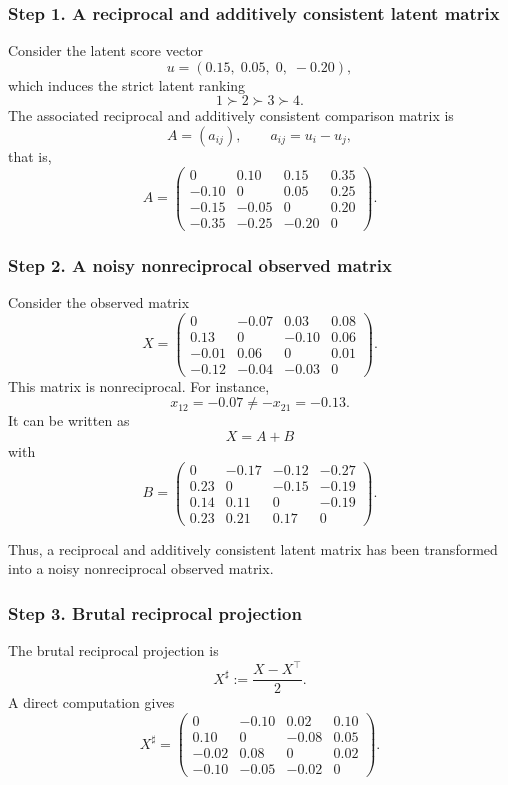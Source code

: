 \documentclass[11pt]{amsart}
\theoremstyle{definition}
\theoremstyle{plain}
\numberwithin{equation}{section}
\begin{document}
\subsubsection*{Step 1. A reciprocal and additively consistent latent matrix}

Consider the latent score vector
\[
u=(0.15,\;0.05,\;0,\;-0.20),
\]
which induces the strict latent ranking
\[
1\succ 2\succ 3\succ 4.
\]
The associated reciprocal and additively consistent comparison matrix is
\[
A=(a_{ij}),\qquad a_{ij}=u_i-u_j,
\]
that is,
\[
A=
\begin{pmatrix}
0 & 0.10 & 0.15 & 0.35\\
-0.10 & 0 & 0.05 & 0.25\\
-0.15 & -0.05 & 0 & 0.20\\
-0.35 & -0.25 & -0.20 & 0
\end{pmatrix}.
\]

\subsubsection*{Step 2. A noisy nonreciprocal observed matrix}

Consider the observed matrix
\[
X=
\begin{pmatrix}
0 & -0.07 & 0.03 & 0.08\\
0.13 & 0 & -0.10 & 0.06\\
-0.01 & 0.06 & 0 & 0.01\\
-0.12 & -0.04 & -0.03 & 0
\end{pmatrix}.
\]
This matrix is nonreciprocal. For instance,
\[
x_{12}=-0.07\neq -x_{21}=-0.13.
\]
It can be written as
\[
X=A+B
\]
with
\[
B=
\begin{pmatrix}
0 & -0.17 & -0.12 & -0.27\\
0.23 & 0 & -0.15 & -0.19\\
0.14 & 0.11 & 0 & -0.19\\
0.23 & 0.21 & 0.17 & 0
\end{pmatrix}.
\]

Thus, a reciprocal and additively consistent latent matrix has been transformed into a noisy nonreciprocal observed matrix.

\subsubsection*{Step 3. Brutal reciprocal projection}

The brutal reciprocal projection is
\[
X^\sharp:=\frac{X-X^\top}{2}.
\]
A direct computation gives
\[
X^\sharp=
\begin{pmatrix}
0 & -0.10 & 0.02 & 0.10\\
0.10 & 0 & -0.08 & 0.05\\
-0.02 & 0.08 & 0 & 0.02\\
-0.10 & -0.05 & -0.02 & 0
\end{pmatrix}.
\]
\end{document}
